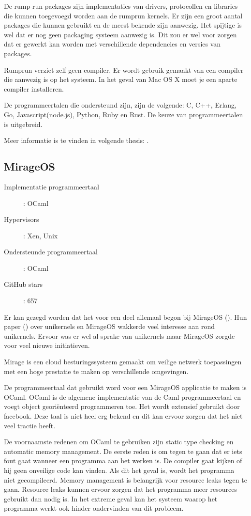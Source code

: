 \documentclass[pdftex,a4paper,12pt,twoside]{report}
\begin{document}
De rump-run packages zijn implementaties van drivers, protocollen en libraries die kunnen toegevoegd worden aan de rumprun kernels. Er zijn een groot aantal packages die kunnen gebruikt en de meest bekende zijn aanwezig.
Het spijtige is wel dat er nog geen packaging systeem aanwezig is. Dit zou er wel voor zorgen dat er gewerkt kan worden met verschillende dependencies en versies van packages.

Rumprun verziet zelf geen compiler. Er wordt gebruik gemaakt van een compiler die aanwezig is op het systeem. In het geval van Mac OS X moet je een aparte compiler installeren.

De programmeertalen die ondersteund zijn, zijn de volgende: C, C++, Erlang, Go, Javascript(node.js), Python, Ruby en Rust. De keuze van programmeertalen is uitgebreid.

Meer informatie is te vinden in volgende thesis: \cite{kantee_flexible_2012}.

\subsection{MirageOS}

\begin{description}
  \item [Implementatie programmeertaal]: OCaml
  \item [Hypervisors]: Xen, Unix
  \item [Ondersteunde programmeertaal]: OCaml
  \item [GitHub stars]: 657
\end{description}

Er kan gezegd worden dat het voor een deel allemaal begon bij MirageOS (\cite{mirage/mirage_0000}). Hun paper (\cite{madhavapeddy_unikernels_2013}) over unikernels en MirageOS wakkerde veel interesse aan rond unikernels. Ervoor was er wel al sprake van unikernels maar MirageOS zorgde voor veel nieuwe initiatieven.

Mirage is een cloud besturingssysteem gemaakt om veilige netwerk toepassingen met een hoge prestatie te maken op verschillende omgevingen.

De programmeertaal dat gebruikt word voor een MirageOS applicatie te maken is OCaml.
OCaml is de algemene implementatie van de Caml programmeertaal en voegt object georiënteerd programmeren toe. Het wordt extensief gebruikt door facebook. Deze taal is niet heel erg bekend en dit kan ervoor zorgen dat het niet veel tractie heeft.

De voornaamste redenen om OCaml te gebruiken zijn static type checking en automatic memory management. De eerste reden is om tegen te gaan dat er iets fout gaat wanneer een programma aan het werken is. De compiler gaat kijken of hij geen onveilige code kan vinden. Als dit het geval is, wordt het programma niet gecompileerd.
Memory management is belangrijk voor resource leaks tegen te gaan. Resource leaks kunnen ervoor zorgen dat het programma meer resources gebruikt dan nodig is. In het extreme geval kan het systeem waarop het programma werkt ook hinder ondervinden van dit probleem.
\end{document}
